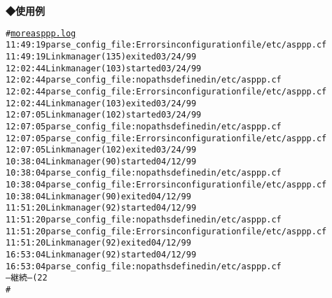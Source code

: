 \noindent
{\bf ◆使用例}
\begin{center}
\begin{breakbox}
\begin{alltt}
# \underline{more asppp.log}
11:49:19 parse_config_file: Errors in configuration file /etc/asppp.cf
11:49:19 Link manager (135) exited 03/24/99
12:02:44 Link manager (103) started 03/24/99
12:02:44 parse_config_file: no paths defined in /etc/asppp.cf
12:02:44 parse_config_file: Errors in configuration file /etc/asppp.cf
12:02:44 Link manager (103) exited 03/24/99
12:07:05 Link manager (102) started 03/24/99
12:07:05 parse_config_file: no paths defined in /etc/asppp.cf
12:07:05 parse_config_file: Errors in configuration file /etc/asppp.cf
12:07:05 Link manager (102) exited 03/24/99
10:38:04 Link manager (90) started 04/12/99
10:38:04 parse_config_file: no paths defined in /etc/asppp.cf
10:38:04 parse_config_file: Errors in configuration file /etc/asppp.cf
10:38:04 Link manager (90) exited 04/12/99
11:51:20 Link manager (92) started 04/12/99
11:51:20 parse_config_file: no paths defined in /etc/asppp.cf
11:51:20 parse_config_file: Errors in configuration file /etc/asppp.cf
11:51:20 Link manager (92) exited 04/12/99
16:53:04 Link manager (92) started 04/12/99
16:53:04 parse_config_file: no paths defined in /etc/asppp.cf
-- 継続 --(22%)  (←継続と出ている場合，space キーを押せば続きを見る事ができる)
#
\end{alltt}
\end{breakbox}
\end{center}
\clearpage
